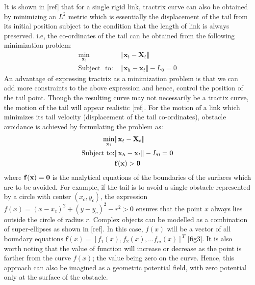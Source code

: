 \documentclass[12pt,a4]{article}
\begin{document}
It is shown in [ref] that for a single rigid link, tractrix curve can also be obtained by minimizing an $L^2$ metric which is essentially the displacement of the tail from its initial position subject to the condition that the length of link is always preserved. i.e, the co-ordinates of the tail can be obtained from the following minimization problem:
\begin{align} \label{eq:Opt_prob_main}
\min_{\textbf{x}_t} &\Vert \textbf{x}_t-\textbf{X}_t \Vert\\
\text{Subject~ to:  } &\Vert \textbf{x}_h - \textbf{x}_t \Vert -L_0 = 0 \nonumber
\end{align}
An advantage of expressing tractrix as a minimization problem is that we can add more constraints to the above expression and hence, control the position of the tail point. Though the resulting curve may not necessarily be a tractix curve, the motion of the tail will appear realistic [ref]. For the motion of a link which minimizes its tail velocity (displacement of the tail co-ordinates), obstacle avoidance is achieved by formulating the problem as:
\begin{align} \label{eq:obstacle_avoidance_opt}
\min_{\textbf{x}_t} &\Vert \textbf{x}_t-\textbf{X}_t \Vert\\
\text{Subject to:} 
&\Vert \textbf{x}_h - \textbf{x}_t \Vert -L_0 = 0 \nonumber \\ 
~~ &\bf{f}(x) >0  \nonumber
\end{align}
where $\bf{f}(x) = 0$ is the analytical equations of the boundaries of the surfaces which are to be avoided. For example, if the tail is to avoid a single obstacle represented by a circle with center $(x_c,y_c)$, the expression $f(x) = (x-x_c)^2+(y-y_c)^2-r^2>0$ ensures that the point $x$ always lies outside the circle of radius $r$. Complex objects can be modelled as a combination of super-ellipses as shown in [ref]. In this case, $f(x)$ will be a vector of all boundary equations $\textbf{f}(x) = [f_1(x),f_2(x),...f_m(x)]^T$ [fig3]. It is also worth noting that the value of function will increase or decrease as the point is farther from the curve $f(x)$; the value being zero on the curve. Hence, this approach can also be imagined as a geometric potential field, with zero potential only at the surface of the obstacle. 
\end{document}
